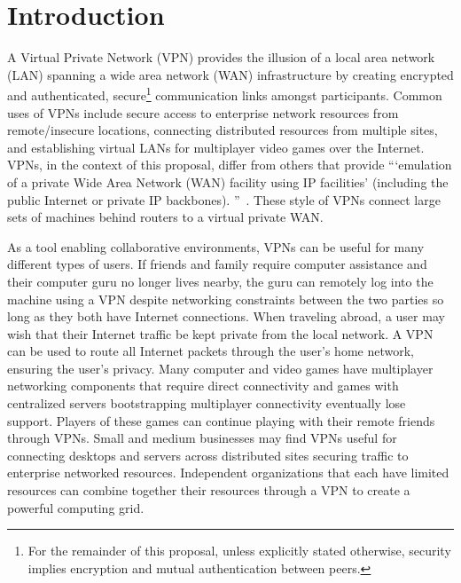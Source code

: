 \chapter{Introduction}
\label{introduction}
A Virtual Private Network (VPN) provides the illusion of a local area network
(LAN) spanning a wide area network (WAN) infrastructure by creating encrypted
and authenticated, secure\footnote{For the remainder of this proposal, unless
explicitly stated otherwise, security implies encryption and mutual
authentication between peers.} communication links amongst participants.
Common uses of VPNs include secure access to enterprise network resources from
remote/insecure locations, connecting distributed resources from multiple
sites, and establishing virtual LANs for multiplayer video games over the
Internet.  VPNs, in the context of this proposal, differ from others that
provide ```emulation of a private Wide Area Network (WAN) facility using IP
facilities' (including the public Internet or private IP backbones).
''~\cite{ip_vpns}.  These style of VPNs connect large sets of machines behind
routers to a virtual private WAN.

As a tool enabling collaborative environments, VPNs can be useful for many
different types of users.  If friends and family require computer assistance
and their computer guru no longer lives nearby, the guru can remotely log into
the machine using a VPN despite networking constraints between the two parties
so long as they both have Internet connections.  When traveling abroad, a user
may wish that their Internet traffic be kept private from the local network.  A 
VPN can be used to route all Internet packets through the user's home network,
ensuring the user's privacy.  Many computer and video games have multiplayer
networking components that require direct connectivity and games with
centralized servers bootstrapping multiplayer connectivity eventually lose
support.   Players of these games can continue playing with their remote friends
through VPNs.  Small and medium businesses may find VPNs useful for connecting
desktops and servers across distributed sites securing traffic to enterprise
networked resources.  Independent organizations that each have limited
resources can combine together their resources through a VPN to create a
powerful computing grid.

